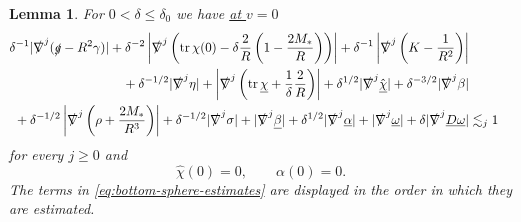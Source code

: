 \documentclass[10pt]{article}
\numberwithin{equation}{section}
\theoremstyle{plain}
\newtheorem{lem}{Lemma}[section]
\theoremstyle{definition}
\newcommand{\les}{\lesssim}
\newcommand{\tr}{\operatorname{tr}}
\begin{document}
\begin{lem}\label{lem:bottom-sphere-estimates}
For $0<\delta\leq \delta_0$  we have \underline{at $v=0$}  
\begin{align}
\nonumber \delta^{-1}|\slashed\nabla^j(\slashed g-R^2\gamma)|+\delta^{-2}\left|\slashed\nabla^j\left(\tr\chi(0)-\delta\frac{2}{R}\left(1-\frac{2M_*}{R}\right)\right)\right|+\delta^{-1} \left|\slashed\nabla^j\left(K-\frac{1}{R^2}\right)\right|\\
 \nonumber  {}  + \delta^{-1/2} |\slashed\nabla^j \eta|+ \left|\slashed\nabla^j \left(\tr\underline\chi +\frac{1}{\delta}\frac{2}{R}\right)\right|+ \delta^{1/2}|\slashed\nabla^j \hat{\underline\chi}|+\delta^{-3/2}|\slashed\nabla^j\beta|&\\
  {} + \delta^{-1/2}\left|\slashed\nabla^j\left(\rho +\frac{2M_*}{R^3}\right)\right|+\delta^{-1/2}|\slashed\nabla^j\sigma|+|\slashed\nabla^j \underline\beta|+\delta^{1/2}|\slashed\nabla^j\underline\alpha|+|\slashed\nabla^j\underline\omega|+\delta |\slashed\nabla^j\underline D\underline\omega|&\les_j 1\label{eq:bottom-sphere-estimates}
\end{align}
 for every $j\ge 0$
and 
\begin{equation}
   \hat\chi(0)=0,\qquad  \alpha(0)=0.\label{eq:trivial-2}
\end{equation}
The terms in \eqref{eq:bottom-sphere-estimates} are displayed in the order in which they are estimated. 
\end{lem}
\end{document}
